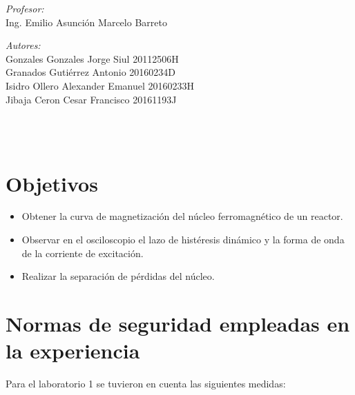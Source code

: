 \documentclass[12pt]{article}
\makeatletter
\let\thedate\@date
\makeatother
\begin{document}
\begin{titlepage}
	\begin{minipage}{0.9\textwidth}
		\begin{flushleft} \large
			\emph{Profesor:}\\
			Ing. Emilio Asunción Marcelo Barreto \newline
		\end{flushleft}
	\end{minipage}
	\begin{minipage}{0.9\textwidth}
		\begin{flushleft} \large
			\emph{Autores:}\\
			Gonzales Gonzales Jorge Siul \quad 20112506H\\
			Granados Gutiérrez Antonio \quad 20160234D\\
			Isidro Ollero Alexander Emanuel \quad 20160233H\\
			Jibaja Ceron Cesar Francisco \quad 20161193J\\
		\end{flushleft}
	\end{minipage}~
	\\[0.5 cm]\thedate\\
\end{titlepage}


\tableofcontents
\pagebreak


\section{Objetivos}
\begin{itemize}
	\item Obtener la curva de magnetización del núcleo ferromagnético de un reactor.
	\item Observar en el osciloscopio el lazo de histéresis dinámico y la forma de onda de la corriente de excitación.
	\item Realizar la separación de pérdidas del núcleo.
\end{itemize}

\section{Normas de seguridad empleadas en la experiencia}
Para el laboratorio 1 se tuvieron en cuenta las siguientes medidas:
\end{document}
